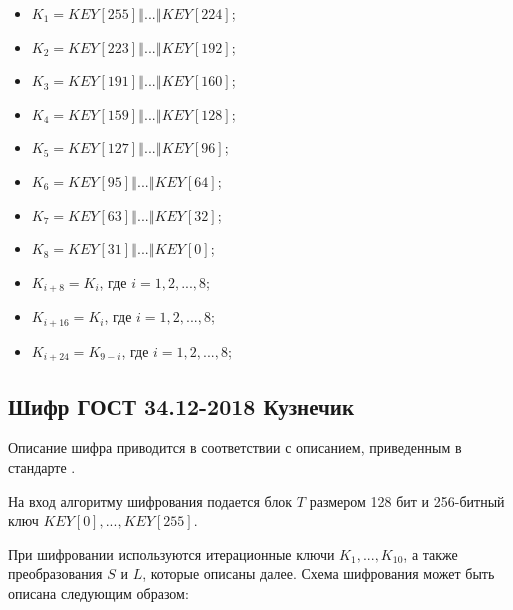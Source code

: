 \documentclass{./civarticle}
\begin{document}
\begin{itemize}
    \begin{itemize}
        \item $K_1 = KEY[255] \mathbin\Vert ... \mathbin\Vert KEY[224]$;

        \item $K_2 = KEY[223] \mathbin\Vert ... \mathbin\Vert KEY[192]$;

        \item $K_3 = KEY[191] \mathbin\Vert ... \mathbin\Vert KEY[160]$;

        \item $K_4 = KEY[159] \mathbin\Vert ... \mathbin\Vert KEY[128]$;

        \item $K_5 = KEY[127] \mathbin\Vert ... \mathbin\Vert KEY[96]$;

        \item $K_6 = KEY[95] \mathbin\Vert ... \mathbin\Vert KEY[64]$;

        \item $K_7 = KEY[63] \mathbin\Vert ... \mathbin\Vert KEY[32]$;

        \item $K_8 = KEY[31] \mathbin\Vert ... \mathbin\Vert KEY[0]$;

        \item $K_{i+8} = K_i$, где $i = 1, 2, ..., 8$;

        \item $K_{i+16} = K_i$, где $i = 1, 2, ..., 8$;

        \item $K_{i+24} = K_{9-i}$, где $i = 1, 2, ..., 8$;
        
    \end{itemize}
\end{itemize}

\subsection{Шифр ГОСТ 34.12-2018 Кузнечик}

Описание шифра приводится в соответствии с описанием, приведенным в стандарте \cite{gost}.

На вход алгоритму шифрования подается блок $T$ размером 128 бит и 256-битный ключ $KEY[0], ..., KEY[255]$.

При шифровании используются итерационные ключи $K_1, ..., K_{10}$, а также преобразования $S$ и $L$, которые описаны далее. Схема шифрования может быть описана следующим образом:
\end{document}
